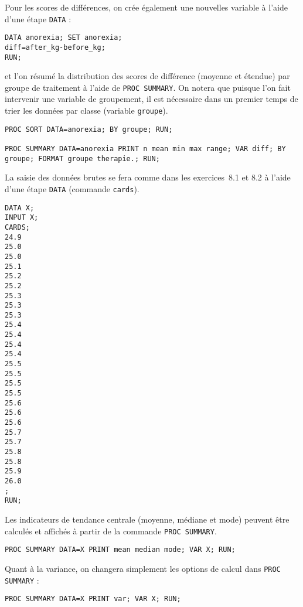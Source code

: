 Pour les scores de différences, on crée également une nouvelles variable
à l'aide d'une étape \texttt{DATA} :
\begin{verbatim}
DATA anorexia; SET anorexia;
diff=after_kg-before_kg;
RUN;
\end{verbatim}
et l'on résumé la distribution des scores de différence (moyenne et étendue)
par groupe de traitement à l'aide de \texttt{PROC SUMMARY}. On notera que
puisque l'on fait intervenir une variable de groupement, il est nécessaire
dans un premier temps de trier les données par classe (variable
\texttt{groupe}). 
\begin{verbatim}
PROC SORT DATA=anorexia; BY groupe; RUN;

PROC SUMMARY DATA=anorexia PRINT n mean min max range; VAR diff; BY groupe; FORMAT groupe therapie.; RUN;
\end{verbatim}
%
%
%
\soln{\ref{exo:8.4}}
La saisie des données brutes se fera comme dans les exercices~8.1 et 8.2 à
l'aide d'une étape \texttt{DATA} (commande \texttt{cards}).
\begin{verbatim}
DATA X;
INPUT X;
CARDS;
24.9
25.0
25.0
25.1
25.2
25.2
25.3
25.3
25.3
25.4
25.4
25.4
25.4
25.5
25.5
25.5
25.5
25.6
25.6
25.6
25.7
25.7
25.8
25.8
25.9
26.0
;
RUN;
\end{verbatim}

Les indicateurs de tendance centrale (moyenne, médiane et mode) peuvent être
calculés et affichés à partir de la commande \texttt{PROC SUMMARY}.
\begin{verbatim}
PROC SUMMARY DATA=X PRINT mean median mode; VAR X; RUN;
\end{verbatim}

Quant à la variance, on changera simplement les options de calcul dans
\texttt{PROC SUMMARY} :
\begin{verbatim}
PROC SUMMARY DATA=X PRINT var; VAR X; RUN;
\end{verbatim}

